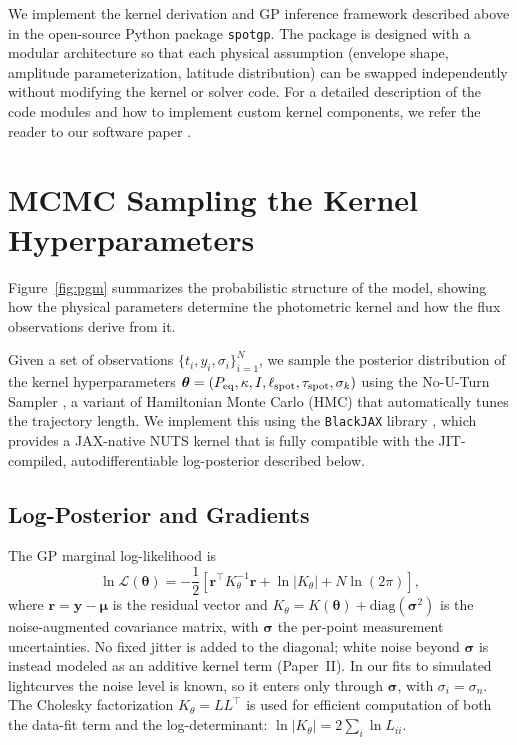 \documentclass[preprint]{aastex702}
\newcommand{\code}[1]{{\texttt{#1}}}
\begin{document}
We implement the kernel derivation and GP inference framework described above in the open-source Python package \code{spotgp}. The package is designed with a modular architecture so that each physical assumption (envelope shape, amplitude parameterization, latitude distribution) can be swapped independently without modifying the kernel or solver code. For a detailed description of the code modules and how to implement custom kernel components, we refer the reader to our software paper \citep{birky_spotgp_2026}.


\clearpage
\section{MCMC Sampling the Kernel Hyperparameters} \label{sec:mcmc}

Figure~\ref{fig:pgm} summarizes the probabilistic structure of the model, showing how the physical parameters determine the photometric kernel and how the flux observations derive from it.



Given a set of observations $\{t_i, y_i, \sigma_i\}_{i=1}^N$, we sample the posterior distribution of the kernel hyperparameters $\boldsymbol{\theta} = (P_{\rm eq}, \kappa, I, \ell_{\rm spot}, \tau_{\rm spot}, \sigma_k)$ using the No-U-Turn Sampler \citep[NUTS;][]{hoffman_no-u-turn_2014}, a variant of Hamiltonian Monte Carlo (HMC) that automatically tunes the trajectory length. We implement this using the \code{BlackJAX} library \citep{lao_blackjax_2020}, which provides a JAX-native NUTS kernel that is fully compatible with the JIT-compiled, autodifferentiable log-posterior described below.

\subsection{Log-Posterior and Gradients}

The GP marginal log-likelihood is
\begin{equation}
    \ln \mathcal{L}(\boldsymbol{\theta}) = -\frac{1}{2}\left[\mathbf{r}^\top K_\theta^{-1} \mathbf{r} + \ln|K_\theta| + N\ln(2\pi)\right],
    \label{eq:gp_loglik}
\end{equation}
where $\mathbf{r} = \mathbf{y} - \boldsymbol{\mu}$ is the residual vector and $K_\theta = K(\boldsymbol{\theta}) + \mathrm{diag}(\boldsymbol{\sigma}^2)$ is the noise-augmented covariance matrix, with $\boldsymbol{\sigma}$ the per-point measurement uncertainties. No fixed jitter is added to the diagonal; white noise beyond $\boldsymbol{\sigma}$ is instead modeled as an additive kernel term (Paper~II). In our fits to simulated lightcurves the noise level is known, so it enters only through $\boldsymbol{\sigma}$, with $\sigma_i = \sigma_n$. The Cholesky factorization $K_\theta = LL^\top$ is used for efficient computation of both the data-fit term and the log-determinant: $\ln|K_\theta| = 2\sum_i \ln L_{ii}$.
\end{document}
